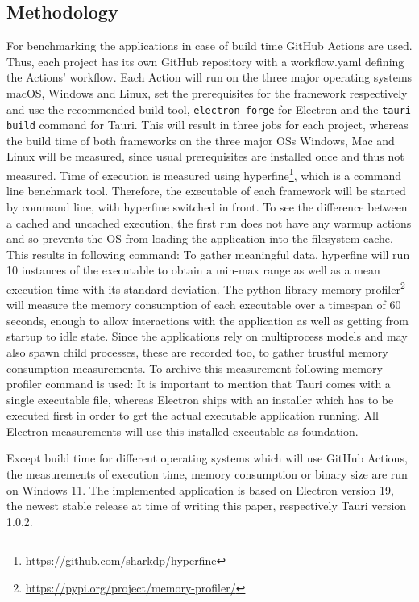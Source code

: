 \subsection{Methodology}
\label{subsec:method}
For benchmarking the applications in case of build time GitHub Actions are used.
Thus, each project has its own GitHub repository with a workflow.yaml defining the Actions' workflow.
Each Action will run on the three major operating systems macOS, Windows and Linux, set the prerequisites for the framework respectively and use the recommended build tool, \texttt{electron-forge} for Electron and the \texttt{tauri build} command for Tauri.
This will result in three jobs for each project, whereas the build time of both frameworks on the three major \ac{OS}s Windows, Mac and Linux will be measured, since usual prerequisites are installed once and thus not measured.
Time of execution is measured using hyperfine\footnote{\url{https://github.com/sharkdp/hyperfine}}, which is a command line benchmark tool.
Therefore, the executable of each framework will be started by command line, with hyperfine switched in front.
To see the difference between a cached and uncached execution, the first run does not have any warmup actions and so prevents the \ac{OS} from loading the application into the filesystem cache.
This results in following command: 
To gather meaningful data, hyperfine will run 10 instances of the executable to obtain a min-max range as well as a mean execution time with its standard deviation.
The python library memory-profiler\footnote{\url{https://pypi.org/project/memory-profiler/}} will measure the memory consumption of each executable over a timespan of 60 seconds,
enough to allow interactions with the application as well as getting from startup to idle state.
Since the applications rely on multiprocess models and may also spawn child processes, these are recorded too, to gather trustful memory consumption measurements.
To archive this measurement following memory profiler command is used: 
It is important to mention that Tauri comes with a single executable file, whereas Electron ships with an installer which has to be executed first in order to get the actual executable application running.
All Electron measurements will use this installed executable as foundation.

Except build time for different operating systems which will use GitHub Actions, the measurements of execution time, memory consumption or binary size
are run on Windows 11.
The implemented application is based on Electron version 19, the newest stable release at time of writing this paper, respectively Tauri version 1.0.2.

